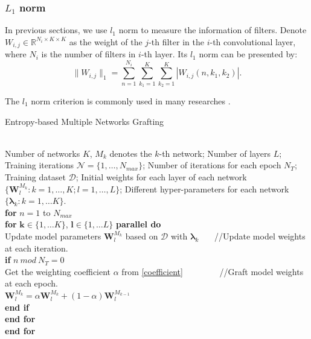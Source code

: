 \documentclass{article}
\begin{document}
\subsubsection{$L_{1}$ norm }\label{sec_3_2_1}	
In previous sections, we use $l_{1}$ norm to measure the information of filters. Denote $W_{i,j}\in \mathbb{R}^{N_{i}\times K\times K }$ as the weight of the $j$-th filter in the $i$-th convolutional layer, where $N_{i}$ is the number of filters in $i$-th layer. Its $l_{1}$ norm can be presented by:
\begin{equation}\label{l1 norm}
	\|W_{i,j}\|_{1}= \sum_{n=1}^{N_{i}}\sum_{k_{1}=1}^{K}\sum_{k_{2}=1}^{K}|W_{i,j}(n,k_{1},k_{2})|.
\end{equation}

The $l_{1}$ norm criterion is commonly used in many researches \cite{li2016pruning,Ye2018Rethinking,Yang2018Soft}. 

\begin{algorithm*}[!t]
	\caption{Entropy-based Multiple Networks Grafting}
	\label{algorithm2}
	\begin{algorithmic}[2]
		\renewcommand{\algorithmicrequire}{\textbf{Input:}}
		\renewcommand{\algorithmicensure}{\textbf{Iteration:}}
		\REQUIRE ~~\\
		Number of networks $K$, $M_{k}$ denotes the $k$-th network; Number of layers $L$; 
		Training iterations $\mathcal N = \{1,\ldots, N_{max}  \}$; Number of iterations for each epoch $N_{T}$; Training dataset $\mathcal D$;
		Initial weights for each layer of each network $\{\mathbf{W}_{l}^{M_{k}}:k=1,\ldots, K; l=1,\ldots, L \}$; Different hyper-parameters for each network $\{\mathbf{\lambda}_k:k=1,\ldots K\}$.	\ENSURE ~~\\
		\textbf{for} $n = 1$ to $N_{max}$   
		\\
		\qquad\textbf{for} $\mathbf{k}\in\{1,\ldots K\}$, $\mathbf{l}\in\{1,\ldots L\}$ \textbf{parallel do}
		\\
		\qquad\qquad Update model parameters $\mathbf{W}^{M_{k}}_{l}$ based on $\mathcal D$ with $\mathbf{\lambda}_k$ ~~~//Update model weights at each iteration.
		\\
		\qquad\qquad \textbf{if} $n~mod~N_{T} = 0$ 
		\\
		\qquad\qquad\qquad Get the weighting coefficient $\alpha$ from \eqref{coefficient} ~~~~~~~~//Graft model weights at each epoch.
		\\
		\qquad\qquad\qquad  $\mathbf{W}^{M_{k}}_{l} = \alpha \mathbf{W}^{M_{k}}_{l} + (1-\alpha)\mathbf{W}^{M_{k-1}}_{l}$  
		\\
		\qquad\qquad \textbf{end if}
		\\
		\qquad\textbf{end for}
		\\
		\textbf{end for}
		\\
	\end{algorithmic}
\end{algorithm*}
\end{document}
